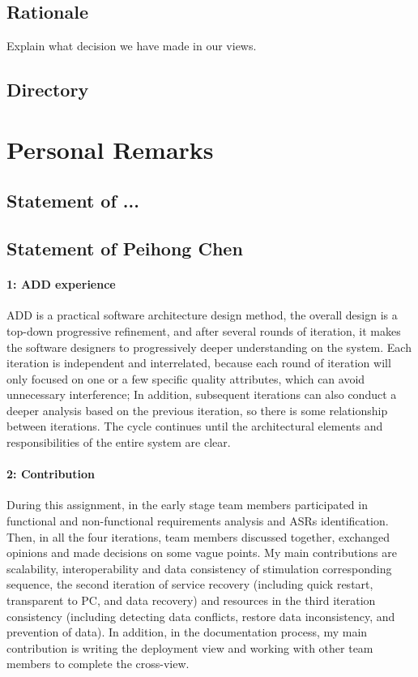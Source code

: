 \documentclass{article}
\begin{document}
	\subsection{Rationale}
	Explain what decision we have made in our views.

	\subsection{Directory}


	\section{Personal Remarks}
	\subsection{Statement of ...}
	\subsection{Statement of Peihong Chen}
	\paragraph{1: ADD experience}
	ADD is a practical software architecture design method, the overall design is a top-down progressive refinement, and after several rounds of iteration, it makes the software designers to progressively deeper understanding on the system. Each iteration is independent and interrelated, because each round of iteration will only focused on one or a few specific quality attributes, which can avoid unnecessary interference; In addition, subsequent iterations can also conduct a deeper analysis based on the previous iteration, so there is some relationship between iterations. The cycle continues until the architectural elements and responsibilities of the entire system are clear.
	\paragraph{2: Contribution}
	During this assignment, in the early stage team members participated in functional and non-functional requirements analysis and ASRs identification. Then, in all the four iterations, team members discussed together, exchanged opinions and made decisions on some vague points. My main contributions are scalability, interoperability and data consistency of stimulation corresponding sequence, the second iteration of service recovery (including quick restart, transparent to PC, and data recovery) and resources in the third iteration consistency (including detecting data conflicts, restore data inconsistency, and prevention of data). In addition, in the documentation process, my main contribution is  writing the deployment view and working with other team members to complete the cross-view.
\end{document}
